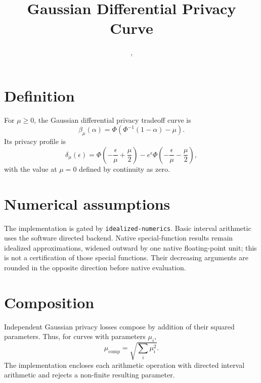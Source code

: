 \documentclass{article}
\title{Gaussian Differential Privacy Curve}
\author{\AishwaryaRamasethuAuthor, \YuJuKuAuthor}
\begin{document}
\maketitle

\section*{Definition}
For $\mu \geq 0$, the Gaussian differential privacy tradeoff curve is
\[
  \beta_\mu(\alpha) = \Phi\left(\Phi^{-1}(1-\alpha)-\mu\right).
\]
Its privacy profile is
\[
  \delta_\mu(\epsilon) =
  \Phi\left(-\frac{\epsilon}{\mu}+\frac{\mu}{2}\right)
  -e^\epsilon\Phi\left(-\frac{\epsilon}{\mu}-\frac{\mu}{2}\right),
\]
with the value at $\mu=0$ defined by continuity as zero.

\section*{Numerical assumptions}
The implementation is gated by \texttt{idealized-numerics}. Basic interval
arithmetic uses the software directed backend. Native special-function results
remain idealized approximations, widened outward by one native floating-point
unit; this is not a certification of those special functions. Their decreasing
arguments are rounded in the opposite direction before native evaluation.

\section*{Composition}
Independent Gaussian privacy losses compose by addition of their squared
parameters. Thus, for curves with parameters $\mu_i$,
\[
  \mu_{\mathrm{comp}} = \sqrt{\sum_i \mu_i^2}.
\]
The implementation encloses each arithmetic operation with directed interval
arithmetic and rejects a non-finite resulting parameter.
\end{document}
